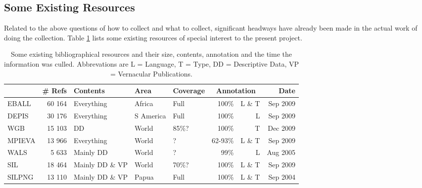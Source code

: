 \documentclass[english,11pt,twoside]{article}
\begin{document}
\subsection{Some Existing Resources}
Related to the above questions of how to collect and what to collect,
significant headways have already been made in the actual work of
doing the collection. Table \ref{res} lists some existing resources 
of special interest to the present project.

\begin{table}
\begin{tabular}{l r l l l r r r}
  & \# Refs & Contents & Area & Coverage & \multicolumn{2}{c}{Annotation} & Date\\ \hline
  EBALL & 60 164 & Everything & Africa & Full & 100\% & L \& T & Sep 2009\\
  DEPIS & 30 176 & Everything & S America & Full & 100\% & L & Sep 2009\\
  WGB    & 15 103 & DD & World & 85\%? & 100\% & T & Dec 2009\\
  MPIEVA & 13 966 & Everything & World & ? & 62-93\% & L \& T & Sep 2009\\
  WALS  &  5 633 & Mainly DD & World & ? & 99\% & L & Aug 2005\\
  SIL   & 18 464 & Mainly DD \& VP & World  & 70\%? & 100\% & L \& T & Sep 2009\\
  SILPNG & 13 110 & Mainly DD \& VP & Papua  & Full & 100\% & L \& T & Sep 2004\\
\end{tabular}
\caption{Some existing bibliographical resources and their size, contents, annotation and the time the information was culled. Abbrevations are L = Language, T = Type, DD = Descriptive Data, VP = Vernacular Publications.}
\label{res}
\end{table}
\end{document}
